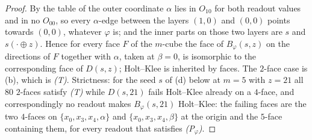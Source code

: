 \documentclass[11pt]{article}
\theoremstyle{plain}
\theoremstyle{definition}
\begin{document}
\begin{proof}
By the table of  the outer coordinate $\alpha$ lies in
$O_{10}$ for both readout values and in no $O_{00}$, so every
$\alpha$-edge between the layers $(1,0)$ and $(0,0)$ points towards
$(0,0)$, whatever $\varphi$ is; and the inner parts on those two layers
are $s$ and $s(\cdot\oplus z)$. Hence for every face $F$ of the $m$-cube
the face of $B_\varphi(s,z)$ on the directions of $F$ together with
$\alpha$, taken at $\beta=0$, is isomorphic to the corresponding face of
$D(s,z)$; Holt--Klee is inherited by faces. The $2$-face case is
(b), which is \emph{(T)}. Strictness: for the seed
$s$ of (d) below at $m=5$ with $z=21$ all $80$
$2$-faces satisfy \emph{(T)} while $D(s,21)$ fails Holt--Klee already on a
$4$-face, and correspondingly no readout makes $B_\varphi(s,21)$
Holt--Klee: the failing faces are the two $4$-faces on
$\{x_0,x_3,x_4,\alpha\}$ and $\{x_0,x_3,x_4,\beta\}$ at the origin and the
$5$-face containing them, for every readout that satisfies
\emph{(P$_\varphi$)}.
\end{proof}
\end{document}
